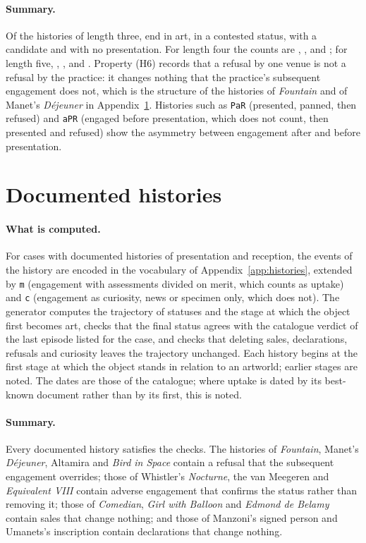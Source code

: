 \documentclass{situationist-preprint}
\begin{document}
\paragraph{Summary.} Of the \stnhistthree{} histories of length three, \sththreeA{} end in art, \sththreeC{} in a contested status, \sththreeK{} with a candidate and \sththreeN{} with no presentation. For length four the counts are \sthfourA, \sthfourC, \sthfourK{} and \sthfourN; for length five, \sthfiveA, \sthfiveC, \sthfiveK{} and \sthfiveN. Property (H6) records that a refusal by one venue is not a refusal by the practice: it changes nothing that the practice's subsequent engagement does not, which is the structure of the histories of \emph{Fountain} and of Manet's \emph{D\'ejeuner} in Appendix~\ref{app:timelines}. Histories such as \texttt{PaR} (presented, panned, then refused) and \texttt{aPR} (engaged before presentation, which does not count, then presented and refused) show the asymmetry between engagement after and before presentation.



\section{Documented histories}\label{app:timelines}

\paragraph{What is computed.} For \stntimelines{} cases with documented histories of presentation and reception, the events of the history are encoded in the vocabulary of Appendix~\ref{app:histories}, extended by \texttt{m} (engagement with assessments divided on merit, which counts as uptake) and \texttt{c} (engagement as curiosity, news or specimen only, which does not). The generator computes the trajectory of statuses and the stage at which the object first becomes art, checks that the final status agrees with the catalogue verdict of the last episode listed for the case, and checks that deleting sales, declarations, refusals and curiosity leaves the trajectory unchanged. Each history begins at the first stage at which the object stands in relation to an artworld; earlier stages are noted. The dates are those of the catalogue; where uptake is dated by its best-known document rather than by its first, this is noted.

\paragraph{Summary.} Every documented history satisfies the checks. The histories of \emph{Fountain}, Manet's \emph{D\'ejeuner}, Altamira and \emph{Bird in Space} contain a refusal that the subsequent engagement overrides; those of Whistler's \emph{Nocturne}, the van Meegeren and \emph{Equivalent VIII} contain adverse engagement that confirms the status rather than removing it; those of \emph{Comedian}, \emph{Girl with Balloon} and \emph{Edmond de Belamy} contain sales that change nothing; and those of Manzoni's signed person and Umanets's inscription contain declarations that change nothing.
\end{document}
